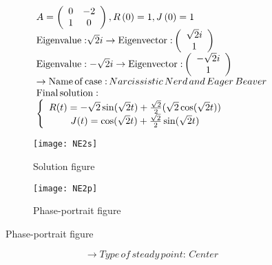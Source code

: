 \documentclass[a4paper]{article}
\begin{document}
\[\begin{array}{l}
A = \left( {\begin{array}{*{20}{c}}
0&{ - 2}\\
1&0
\end{array}} \right),R\left( 0 \right) = 1,J\left( 0 \right) = 1\\
{\rm{Eigenvalue:}}\sqrt 2 i \to {\rm{Eigenvector:}}\left( {\begin{array}{*{20}{c}}
{\sqrt 2 i}\\
1
\end{array}} \right)\\
{\rm{Eigenvalue: - }}\sqrt 2 i \to {\rm{Eigenvector:}}\left( {\begin{array}{*{20}{c}}
{ - \sqrt 2 i}\\
1
\end{array}} \right)\\
 \to {\rm{Name}}\,{\rm{of}}\,{\rm{case:}}\,Narcissistic\,Nerd\,and\,Eager\,Beaver\\
{\rm{Final}}\,{\rm{solution:}}\\
\left\{ {\begin{array}{*{20}{c}}
{R(t) =  - \sqrt 2 \sin (\sqrt 2 t) + \frac{{\sqrt 2 }}{2}(\sqrt 2 \cos (\sqrt 2 t))}\\
{J(t) = \cos (\sqrt 2 t) + \frac{{\sqrt 2 }}{2}\sin (\sqrt 2 t)}
\end{array}} \right.
\end{array}\]
\begin{figure}[H]
\centering
\begin{subfigure}{.5\textwidth}
  \centering
  \texttt{[image: NE2s]}
  \caption*{Solution figure}
\end{subfigure}%
\begin{subfigure}{.5\textwidth}
  \centering
  \texttt{[image: NE2p]}
  \caption*{Phase-portrait figure}
\end{subfigure}
\end{figure}
\[  \to  Type\,of\,steady\,point:\,Center\]
\end{document}

